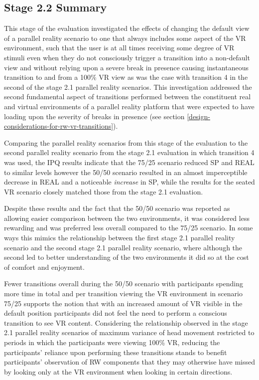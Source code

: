 \subsection{Stage 2.2 Summary}

This stage of the evaluation investigated the effects of changing the default view of a parallel reality scenario to one that always includes some aspect of the VR environment, such that the user is at all times receiving some degree of VR stimuli even when they do not consciously trigger a transition into a non-default view and without relying upon a severe break in presence causing instantaneous transition to and from a 100\% VR view as was the case with transition 4 in the second of the stage 2.1 parallel reality scenarios. This investigation addressed the second fundamental aspect of transitions performed between the constituent real and virtual environments of a parallel reality platform that were expected to have loading upon the severity of breaks in presence (see section \ref{design-considerations-for-rw-vr-transitions}).

Comparing the parallel reality scenarios from this stage of the evaluation to the second parallel reality scenario from the stage 2.1 evaluation in which transition 4 was used, the IPQ results indicate that the 75/25 scenario reduced SP and REAL to similar levels however the 50/50 scenario resulted in an almost imperceptible decrease in REAL and a noticeable \textit{increase} in SP, while the results for the seated VR scenario closely matched those from the stage 2.1 evaluation.

Despite these results and the fact that the 50/50 scenario was reported as allowing easier comparison between the two environments, it was considered less rewarding and was preferred less overall compared to the 75/25 scenario. In some ways this mimics the relationship between the first stage 2.1 parallel reality scenario and the second stage 2.1 parallel reality scenario, where although the second led to better understanding of the two environments it did so at the cost of comfort and enjoyment.

Fewer transitions overall during the 50/50 scenario with participants spending more time in total and per transition viewing the VR environment in scenario 75/25 supports the notion that with an increased amount of VR visible in the default position participants did not feel the need to perform a conscious transition to see VR content. Considering the relationship observed in the stage 2.1 parallel reality scenarios of maximum variance of head movement restricted to periods in which the participants were viewing 100\% VR, reducing the participants' reliance upon performing these transitions stands to benefit participants' observation of RW components that they may otherwise have missed by looking only at the VR environment when looking in certain directions.


